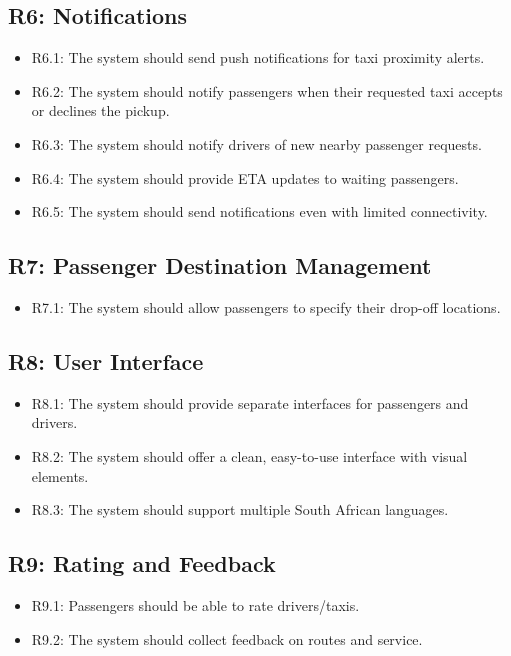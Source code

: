 \documentclass[a4paper,12pt]{article}
\begin{document}
\subsection*{R6: Notifications}
\begin{itemize}
    \item R6.1: The system should send push notifications for taxi proximity alerts.
    \item R6.2: The system should notify passengers when their requested taxi accepts or declines the pickup.
    \item R6.3: The system should notify drivers of new nearby passenger requests.
    \item R6.4: The system should provide ETA updates to waiting passengers.
    \item R6.5: The system should send notifications even with limited connectivity.
\end{itemize}

\subsection*{R7: Passenger Destination Management}
\begin{itemize}
    \item R7.1: The system should allow passengers to specify their drop-off locations.
\end{itemize}

\subsection*{R8: User Interface}
\begin{itemize}
    \item R8.1: The system should provide separate interfaces for passengers and drivers.
    \item R8.2: The system should offer a clean, easy-to-use interface with visual elements.
    \item R8.3: The system should support multiple South African languages. 
\end{itemize}

\subsection*{R9: Rating and Feedback}
\begin{itemize}
    \item R9.1: Passengers should be able to rate drivers/taxis.
    \item R9.2: The system should collect feedback on routes and service.
\end{itemize}
\end{document}
